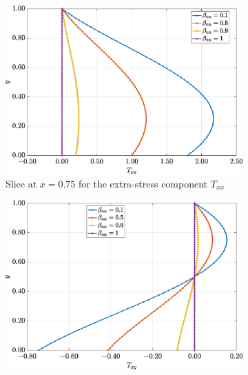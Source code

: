 \documentclass[preprint, 12pt]{elsarticle}
\begin{document}
\begin{figure}[H]
    \centering
    \begin{subfigure}[b]{.46\textwidth}
        \includegraphics[width=\textwidth]{Slice_x_Tog_Numerical_NormErr_2nd_Betann_1_Re_1000_Wi_1_epsilon_0_xi_0_alphaG_0.5_Dt_1e-06_at_0.05_tipsim_1_MMS_12_x0.75y0.75_Txx.eps}
        \caption{Slice at $x=0.75$ for the extra-stress component $T_{xx}$}
        \label{fig_slice_y_txx_2nd_Case1_giesekus_x075}
    \end{subfigure}
    \vspace{0.2cm}
    \qquad
    \begin{subfigure}[b]{.46\textwidth}
        \includegraphics[width=\textwidth]{Slice_x_Tog_Numerical_NormErr_2nd_Betann_1_Re_1000_Wi_1_epsilon_0_xi_0_alphaG_0.5_Dt_1e-06_at_0.05_tipsim_1_MMS_12_x0.75y0.75_Txy.eps}

\end{subfigure}
\end{figure}
\end{document}

